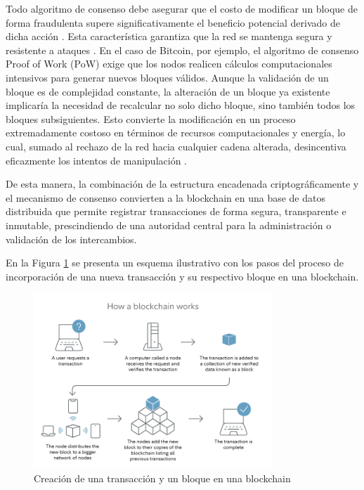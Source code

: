 Todo algoritmo de consenso debe asegurar que el costo de modificar un bloque de forma fraudulenta supere significativamente el beneficio potencial derivado de dicha acción \cite{satoshi2008bitcoin}. Esta característica garantiza que la red se mantenga segura y resistente a ataques \cite{buterin2013ethereum}. En el caso de Bitcoin, por ejemplo, el algoritmo de consenso Proof of Work (PoW) exige que los nodos realicen cálculos computacionales intensivos para generar nuevos bloques válidos. Aunque la validación de un bloque es de complejidad constante, la alteración de un bloque ya existente implicaría la necesidad de recalcular no solo dicho bloque, sino también todos los bloques subsiguientes. Esto convierte la modificación en un proceso extremadamente costoso en términos de recursos computacionales y energía, lo cual, sumado al rechazo de la red hacia cualquier cadena alterada, desincentiva eficazmente los intentos de manipulación \cite{satoshi2008bitcoin}.

De esta manera, la combinación de la estructura encadenada criptográficamente y el mecanismo de consenso convierten a la blockchain en una base de datos distribuida que permite registrar transacciones de forma segura, transparente e inmutable, prescindiendo de una autoridad central para la administración o validación de los intercambios.

En la Figura \ref{fig:blockchain-working} se presenta un esquema ilustrativo con los pasos del proceso de incorporación de una nueva transacción y su respectivo bloque en una blockchain. 

\begin{figure}[h]
    \centering
    \includegraphics[width=0.8\textwidth]{Figures/block-creation.png}
    \caption{Creación de una transacción y un bloque en una blockchain}
    \label{fig:blockchain-working}
\end{figure}

